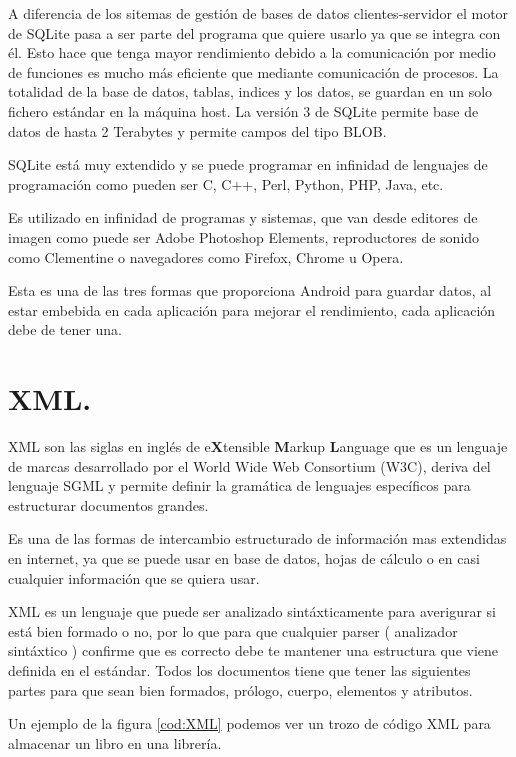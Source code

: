 A diferencia de los sitemas de gestión de bases de datos clientes-servidor el motor de SQLite pasa a ser parte del programa que quiere usarlo ya que se integra con él. Esto hace que tenga mayor rendimiento debido a la comunicación por medio de funciones es mucho más eficiente que mediante comunicación de procesos. La totalidad de la base de datos, tablas, indices y los datos, se guardan en un solo fichero estándar en la máquina host. La versión 3 de SQLite permite base de datos de hasta 2 Terabytes y permite campos del tipo BLOB.

SQLite está muy extendido y se puede programar en infinidad de lenguajes de programación como pueden ser C, C++, Perl, Python, PHP, Java, etc.

Es utilizado en infinidad de programas y sistemas, que van desde editores de imagen como puede ser Adobe Photoshop Elements, reproductores de sonido como Clementine o navegadores como Firefox, Chrome u Opera.

Esta es una de las tres formas que proporciona Android para guardar datos, al estar embebida en cada aplicación para mejorar el rendimiento, cada aplicación debe de tener una. 

\section{XML.}

XML son las siglas en inglés de e\textbf{X}tensible \textbf{M}arkup \textbf{L}anguage que es un lenguaje de marcas desarrollado por el World Wide Web Consortium (W3C), deriva del lenguaje SGML y permite definir la gramática de lenguajes específicos para estructurar documentos grandes.

Es una de las formas de intercambio estructurado de información mas extendidas en internet, ya que se puede usar en base de datos, hojas de cálculo o en casi cualquier información que se quiera usar.

XML es un lenguaje que puede ser analizado sintáxticamente para averigurar si está bien formado o no, por lo que para que cualquier parser ( analizador sintáxtico ) confirme que es correcto debe te mantener una estructura que viene definida en el estándar. Todos los documentos tiene que tener las siguientes partes para que sean bien formados, prólogo, cuerpo, elementos y atributos.

Un ejemplo de la figura \ref{cod:XML} podemos ver un trozo de código XML para almacenar un libro en una librería.

